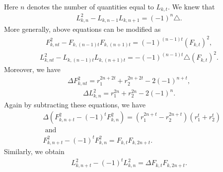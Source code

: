 Here $n$ denotes the number of quantities equal to $L_{k,t}$. We knew that
\begin{align*}
  L_{k,n}^2 - L_{k,n-1}L_{k,n+1}= (-1)^n \triangle.
 \end{align*}
 More generally, above equations can be modified as
\begin{align*}
  F_{k,nt}^2 - F_{k,(n-1)t}F_{k,(n+1)t}=(-1)^{(n-1)t}(F_{k,t})^2,
 \end{align*}
 \begin{align*}
  L_{k,nt}^2 - L_{k,(n-1)t}L_{k,(n+1)t}=-(-1)^{(n-1)t}\triangle (F_{k,t})^2.
 \end{align*}
 Moreover, we have
 \begin{align*}
  \Delta F_{k,nt}^2 =r_1^{2n+2t}+r_2^{2n+2t}- 2 (-1)^{n+t},
 \end{align*}
 \begin{align*}
  \Delta L_{k,n}^2 =r_1^{2n}+r_2^{2n}- 2 (-1)^{n}.
 \end{align*}
 Again by subtracting these equations, we have
  \begin{align*}
  &\Delta(F_{k,n+t}^2-(-1)^t F_{k,n}^2) = (r_1^{2n+t}-r_2^{2n+t})(r_{1}^t+r_{2}^t)\\
 &\text{ and}\\
   &F_{k,n+t}^2-(-1)^t F_{k,n}^2 = F_{k,t} F_{k, 2n+t}.
 \end{align*}
 Similarly, we obtain
   \begin{align*}
 L_{k,n+t}^2-(-1)^t L_{k,n}^2 = \Delta F_{k,t} F_{k, 2n+t}.
 \end{align*}
